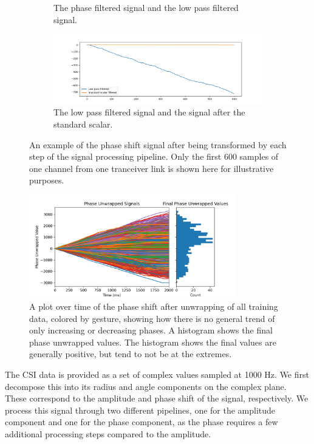 \begin{figure}
\begin{subfigure}{0.49\textwidth}
		\caption{The phase filtered signal and the low pass filtered signal.}
	\end{subfigure}
	\hfill
	\begin{subfigure}{0.49\textwidth}
		\centering
		\includegraphics[width=\textwidth]{figures/phase_step_4}
		\caption{The low pass filtered signal and the signal after the standard scalar.}
	\end{subfigure}
	\hfill
	\caption{An example of the phase shift signal after being transformed by each step of the signal processing pipeline. Only the first 600 samples of one channel from one tranceiver link is shown here for illustrative purposes.} \label{fig:phase-pipeline}
\end{figure}

\begin{figure}
	\centering
	\includegraphics[width=0.8\textwidth]{figures/phase_unwrap}
	\caption{A plot over time of the phase shift after unwrapping of all training data, colored by gesture, showing how there is no general trend of only increasing or decreasing phases. A histogram shows the final phase unwrapped values. The histogram shows the final values are generally positive, but tend to not be at the extremes.}\label{fig:phase-unwrap}
\end{figure}

The CSI data is provided as a set of complex values sampled at 1000 Hz.
We first decompose this into its radius and angle components on the complex plane.
These correspond to the amplitude and phase shift of the signal, respectively.
We process this signal through two different pipelines, one for the amplitude component and one for the phase component, as the phase requires a few additional processing steps compared to the amplitude.

